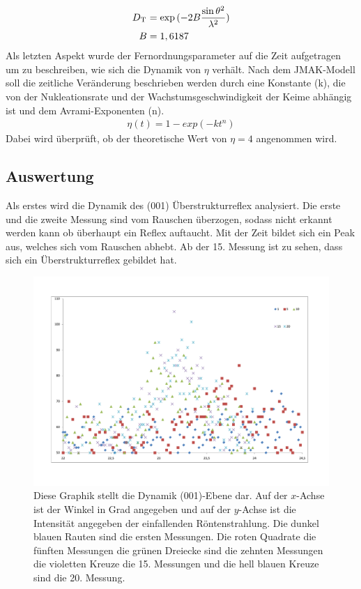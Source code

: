 \documentclass[
	a4paper,
	12pt,
	pagesize,
	ngerman
]{scrartcl}
\begin{document}
\begin{align}
    D_\textsuperscript{T} &= \exp{(-2B\frac{\sin{\theta}^2}{\lambda^2})} \\
    B &= 1,6187
\end{align}
Als letzten Aspekt wurde der Fernordnungsparameter auf die Zeit aufgetragen um zu beschreiben, wie sich die Dynamik von $\eta$ verhält. Nach dem JMAK-Modell soll die zeitliche Veränderung beschrieben werden durch eine Konstante (k), die von der Nukleationsrate und der Wachstumsgeschwindigkeit der Keime abhängig ist und dem Avrami-Exponenten (n).
\begin{align}
    \eta(t) = 1- exp(-kt^n)
\end{align}
Dabei wird überprüft, ob der theoretische Wert von $\eta = 4$ angenommen wird.

\subsection{Auswertung}
Als erstes wird die Dynamik des (001) Überstrukturreflex analysiert. Die erste und die zweite Messung sind vom Rauschen überzogen, sodass nicht erkannt werden kann ob überhaupt ein Reflex auftaucht. Mit der Zeit bildet sich ein Peak aus, welches sich vom Rauschen abhebt. Ab der 15. Messung ist zu sehen, dass sich ein Überstrukturreflex gebildet hat.
\begin{figure}[h!]
    \centering
    \includegraphics[scale = 0.5]{Bragg Punkte.pdf}
    \caption{Diese Graphik stellt die Dynamik (001)-Ebene dar. Auf der $x$-Achse ist der Winkel in Grad angegeben und auf der $y$-Achse ist die Intensität angegeben der einfallenden Röntenstrahlung. Die dunkel blauen Rauten sind die ersten Messungen. Die roten Quadrate die fünften Messungen die grünen Dreiecke sind die zehnten Messungen die violetten Kreuze die 15. Messungen und die hell blauen Kreuze sind die 20. Messung.}
    \label{A3}
\end{figure}
\end{document}
